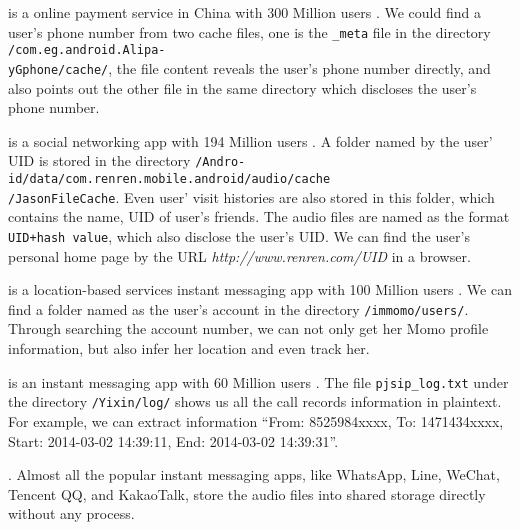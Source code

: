 \documentclass{sig-alternate}
\begin{document}
\vspace{2pt} is a online payment service in China with 300 Million users \cite{Alipayusers}. We could find a user's phone number from two cache files, one is the \texttt{\_meta} file in the directory \texttt{/com.eg.android.Alipa-\\yGphone/cache/}, the file content reveals the user's phone number directly, and also points out the other file in the same directory which discloses the user's phone number.



\vspace{2pt} is a social networking app with 194 Million users \cite{Renrenusers}. A folder named by the user' UID is stored in the directory \texttt{/Andro-\\id/data/com.renren.mobile.android/audio/cache\\/JasonFileCache}. Even user' visit histories are also stored in this folder, which contains the name, UID of user's friends. The audio files are named as the format \texttt{UID+hash value}, which also disclose the user's UID. We can find the user's personal home page by the URL \textit{http://www.renren.com/UID} in a browser.

\vspace{2pt} is a location-based services instant messaging app with 100 Million users \cite{Momousers}. We can find a folder named as the user's account in the directory \texttt{/immomo/users/}. Through searching the account number, we can not only get her Momo profile information, but also infer her location and even track her.

\vspace{2pt} is an instant messaging app with 60 Million users \cite{Yixinusers}. The file \texttt{pjsip\_log.txt} under the directory \texttt{/Yixin/log/} shows us all the call records information in plaintext. For example, we can extract information ``From: 8525984xxxx, To: 1471434xxxx, Start: 2014-03-02 14:39:11, End: 2014-03-02 14:39:31''.

\vspace{2pt}. Almost all the popular instant messaging apps, like WhatsApp, Line, WeChat, Tencent QQ, and KakaoTalk, store the audio files into shared storage directly without any process.
\end{document}
